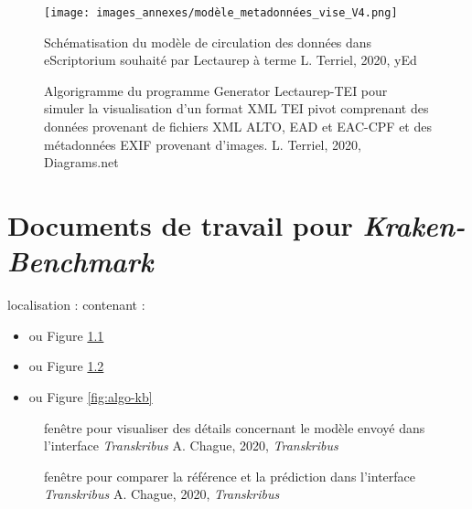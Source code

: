 \begin{figure}
  \begin{sideways}
    \texttt{[image: images\_annexes/modèle\_metadonnées\_vise\_V4.png]}
  \end{sideways}
  \centering
  \caption{Schématisation du modèle de circulation des données dans eScriptorium souhaité par Lectaurep à terme  \textcopyright L. Terriel, 2020, yEd}
  \label{fig:modele_vise_V4}
\end{figure}

\begin{figure}
    \centering
    \centerline{}
    \caption{Algorigramme du programme Generator Lectaurep-TEI pour simuler la visualisation d'un format XML TEI pivot comprenant des données provenant de fichiers XML ALTO, EAD et EAC-CPF et des métadonnées EXIF provenant d'images.   \textcopyright L. Terriel, 2020, Diagrams.net}
    \label{fig:generateur_tei}
\end{figure}

\chapter{Documents de travail pour \textit{\textit{Kraken-Benchmark}}}\label{doc_ax_kb}
localisation :  contenant :

\begin{itemize}
    \item {} ou Figure \ref{fig:details-model-transkribus}
    \item {} ou Figure \ref{fig:compare-texts-transkribus}
    \item {} ou Figure \ref{fig:algo-kb}
\end{itemize}

\begin{figure}
    \centering
    \centerline{}
    \caption{fenêtre pour visualiser des détails concernant le modèle envoyé dans l'interface \textit{Transkribus} \textcopyright A. Chague, 2020, \textit{Transkribus}}
    \label{fig:details-model-transkribus}
\end{figure}

\begin{figure}
    \centering
    \centerline{}
    \caption{fenêtre pour comparer la référence et la prédiction dans l'interface \textit{Transkribus} \textcopyright A. Chague, 2020, \textit{Transkribus}}
    \label{fig:compare-texts-transkribus}
\end{figure}

